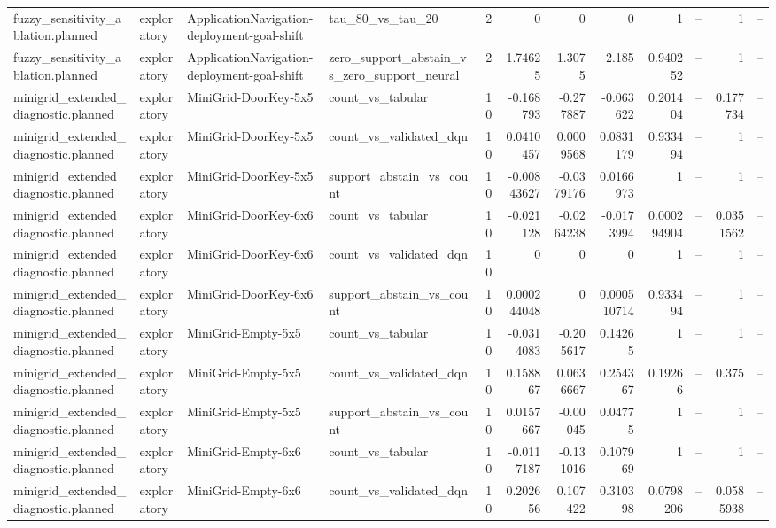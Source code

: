\begin{longtable}{llllrrrrrrrr}
fuzzy\_sensitivity\_ablation.planned & exploratory & ApplicationNavigation-deployment-goal-shift & tau\_80\_vs\_tau\_20 & 2 & 0 & 0 & 0 & 1 & -- & 1 & -- \\
fuzzy\_sensitivity\_ablation.planned & exploratory & ApplicationNavigation-deployment-goal-shift & zero\_support\_abstain\_vs\_zero\_support\_neural & 2 & 1.74625 & 1.3075 & 2.185 & 0.940252 & -- & 1 & -- \\
minigrid\_extended\_diagnostic.planned & exploratory & MiniGrid-DoorKey-5x5 & count\_vs\_tabular & 10 & -0.168793 & -0.277887 & -0.063622 & 0.201404 & -- & 0.177734 & -- \\
minigrid\_extended\_diagnostic.planned & exploratory & MiniGrid-DoorKey-5x5 & count\_vs\_validated\_dqn & 10 & 0.0410457 & 0.0009568 & 0.0831179 & 0.933494 & -- & 1 & -- \\
minigrid\_extended\_diagnostic.planned & exploratory & MiniGrid-DoorKey-5x5 & support\_abstain\_vs\_count & 10 & -0.00843627 & -0.0379176 & 0.0166973 & 1 & -- & 1 & -- \\
minigrid\_extended\_diagnostic.planned & exploratory & MiniGrid-DoorKey-6x6 & count\_vs\_tabular & 10 & -0.021128 & -0.0264238 & -0.0173994 & 0.000294904 & -- & 0.0351562 & -- \\
minigrid\_extended\_diagnostic.planned & exploratory & MiniGrid-DoorKey-6x6 & count\_vs\_validated\_dqn & 10 & 0 & 0 & 0 & 1 & -- & 1 & -- \\
minigrid\_extended\_diagnostic.planned & exploratory & MiniGrid-DoorKey-6x6 & support\_abstain\_vs\_count & 10 & 0.000244048 & 0 & 0.000510714 & 0.933494 & -- & 1 & -- \\
minigrid\_extended\_diagnostic.planned & exploratory & MiniGrid-Empty-5x5 & count\_vs\_tabular & 10 & -0.0314083 & -0.205617 & 0.14265 & 1 & -- & 1 & -- \\
minigrid\_extended\_diagnostic.planned & exploratory & MiniGrid-Empty-5x5 & count\_vs\_validated\_dqn & 10 & 0.158867 & 0.0636667 & 0.254367 & 0.19266 & -- & 0.375 & -- \\
minigrid\_extended\_diagnostic.planned & exploratory & MiniGrid-Empty-5x5 & support\_abstain\_vs\_count & 10 & 0.0157667 & -0.00045 & 0.04775 & 1 & -- & 1 & -- \\
minigrid\_extended\_diagnostic.planned & exploratory & MiniGrid-Empty-6x6 & count\_vs\_tabular & 10 & -0.0117187 & -0.131016 & 0.107969 & 1 & -- & 1 & -- \\
minigrid\_extended\_diagnostic.planned & exploratory & MiniGrid-Empty-6x6 & count\_vs\_validated\_dqn & 10 & 0.202656 & 0.107422 & 0.310398 & 0.0798206 & -- & 0.0585938 & -- \\

\end{longtable}
